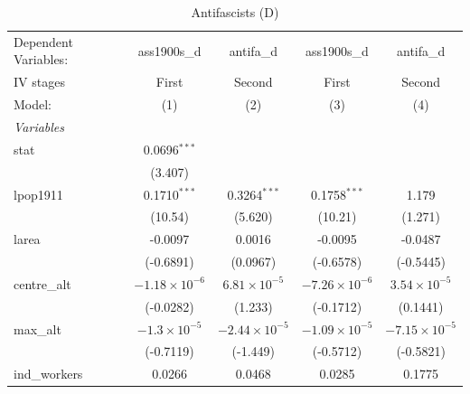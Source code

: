 
\begin{table}[htbp]
   \caption{Antifascists (D)}
   \centering
   \begin{tabular}{lcccc}
      \tabularnewline \midrule \midrule
      Dependent Variables:             & ass1900s\_d            & antifa\_d              & ass1900s\_d            & antifa\_d\\   
      IV stages                        & First                  & Second                 & First                  & Second \\   
      Model:                           & (1)                    & (2)                    & (3)                    & (4)\\  
      \midrule
      \emph{Variables}\\
      stat                             & 0.0696$^{***}$         &                        &                        &   \\   
                                       & (3.407)                &                        &                        &   \\   
      lpop1911                         & 0.1710$^{***}$         & 0.3264$^{***}$         & 0.1758$^{***}$         & 1.179\\   
                                       & (10.54)                & (5.620)                & (10.21)                & (1.271)\\   
      larea                            & -0.0097                & 0.0016                 & -0.0095                & -0.0487\\   
                                       & (-0.6891)              & (0.0967)               & (-0.6578)              & (-0.5445)\\   
      centre\_alt                      & $-1.18\times 10^{-6}$  & $6.81\times 10^{-5}$   & $-7.26\times 10^{-6}$  & $3.54\times 10^{-5}$\\    
                                       & (-0.0282)              & (1.233)                & (-0.1712)              & (0.1441)\\   
      max\_alt                         & $-1.3\times 10^{-5}$   & $-2.44\times 10^{-5}$  & $-1.09\times 10^{-5}$  & $-7.15\times 10^{-5}$\\    
                                       & (-0.7119)              & (-1.449)               & (-0.5712)              & (-0.5821)\\   
      ind\_workers                     & 0.0266                 & 0.0468                 & 0.0285                 & 0.1775\\   

\end{tabular}
\end{table}
